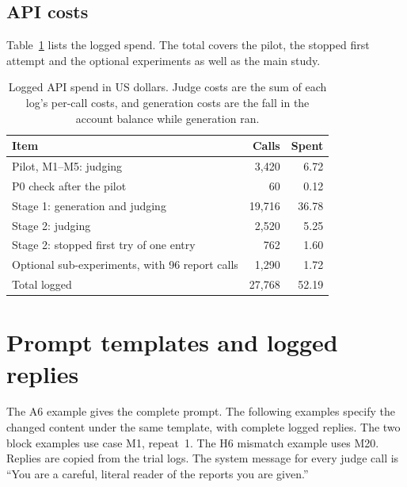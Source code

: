 \subsection{API costs}
\label{app:costs}
Table~\ref{tab:costs} lists the logged spend. The total covers the pilot, the stopped first attempt
and the optional experiments as well as the main study.

\begin{table}[H]
\centering\small
\caption{Logged API spend in US dollars. Judge costs are the sum of each log's per-call costs,
and generation costs are the fall in the account balance while generation ran.}
\label{tab:costs}
\begin{tabular}{@{}l r r@{}}
\toprule
Item & Calls & Spent\\
\midrule
Pilot, M1--M5: judging & 3,420 & 6.72\\
P0 check after the pilot & 60 & 0.12\\
Stage 1: generation and judging & 19,716 & 36.78\\
Stage 2: judging & 2,520 & 5.25\\
Stage 2: stopped first try of one entry & 762 & 1.60\\
Optional sub-experiments, with 96 report calls & 1,290 & 1.72\\
\midrule
Total logged & 27,768 & 52.19\\
\bottomrule
\end{tabular}
\end{table}

\clearpage
\section{Prompt templates and logged replies}
\label{app:prompts}

The A6 example gives the complete prompt. The following examples specify the changed
content under the same template, with complete logged replies. The two block examples use
case M1, repeat~1. The H6 mismatch example uses M20. Replies are copied from the trial logs. The system message for every
judge call is ``You are a careful, literal reader of the reports you are given.''

